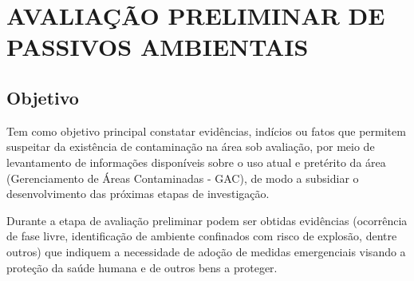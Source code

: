 \chapter{AVALIAÇÃO PRELIMINAR DE PASSIVOS AMBIENTAIS}

\section{Objetivo}

Tem como objetivo principal constatar evidências, indícios 
ou fatos que permitem suspeitar da existência de 
contaminação na área sob avaliação, por meio de 
levantamento de informações disponíveis sobre o uso atual e 
pretérito da área (Gerenciamento de Áreas Contaminadas - 
GAC), de modo a subsidiar o desenvolvimento das próximas 
etapas de investigação.

Durante a etapa de avaliação preliminar podem ser obtidas 
evidências (ocorrência de fase livre, identificação de 
ambiente confinados com risco de explosão, dentre outros) 
que indiquem a necessidade de adoção de medidas 
emergenciais visando a proteção da saúde humana e de outros 
bens a proteger.